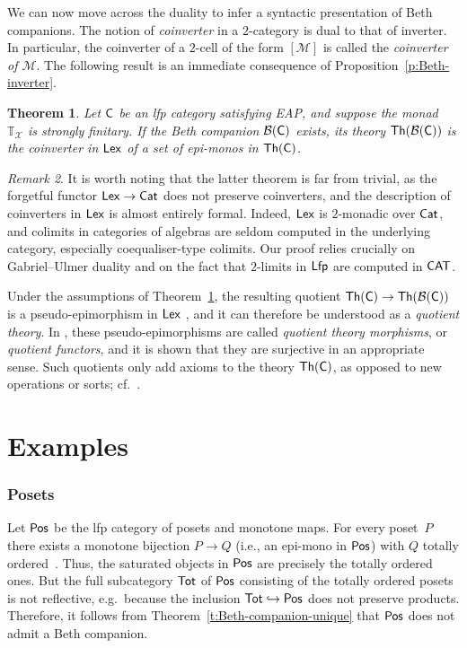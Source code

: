 \documentclass[a4paper,10pt,reqno]{amsart}
\newtheorem{theorem}{Theorem}[section]
\theoremstyle{definition}
\theoremstyle{remark}
\newtheorem{remark}[theorem]{Remark}
\newcommand{\cat}{{\sf C}}								%
\newcommand{\Pos}{{\sf Pos}}								%
\newcommand{\Tot}{{\sf Tot}}								%
\newcommand{\B}[1]{\mathcal{B}(#1)}						%
\newcommand{\Lfp}{{\sf Lfp}}								%
\newcommand{\Lex}{{\sf Lex}}								%
\newcommand{\Cat}{{\sf Cat}}								%
\newcommand{\CAT}{{\sf CAT}}								%
\newcommand{\ar}[1]{\mathcal{#1}}							%
\newcommand{\X}{\ar{X}}									%
\newcommand{\into}{\hookrightarrow}						%
\newcommand{\EAP}{\textnormal{EAP}}
\begin{document}
We can now move across the duality to infer a syntactic presentation of Beth companions. The notion of \emph{coinverter} in a $2$-category is dual to that of inverter. In particular, the coinverter of a $2$-cell of the form $[\ar{M}]$ is called the \emph{coinverter of $\ar{M}$}. The following result is an immediate consequence of Proposition~\ref{p:Beth-inverter}.


\begin{theorem}\label{t:syntactic-Beth-companion}
  Let $\cat$ be an lfp category satisfying \EAP, and suppose the monad~$\mathbb{T}_{\X}$ is strongly finitary. If the Beth companion $\B{\cat}$ exists, its theory $\mathsf{Th}(\B{\cat})$ is the coinverter in $\Lex$ of a set of epi-monos in $\mathsf{Th}(\cat)$.
\end{theorem}

\begin{remark}
  It is worth noting that the latter theorem is far from trivial, as the forgetful functor $\Lex \to \Cat$ does not preserve coinverters, and the description of coinverters in $\Lex$ is almost entirely formal. Indeed, $\Lex$ is $2$-monadic over $\Cat$, and colimits in categories of algebras are seldom computed in the underlying category, especially coequaliser-type colimits. Our proof relies crucially on Gabriel--Ulmer duality and on the fact that $2$-limits in $\Lfp$ are computed in $\CAT$.
\end{remark}

Under the assumptions of Theorem~\ref{t:syntactic-Beth-companion}, the resulting quotient $\mathsf{Th}(\cat) \to \mathsf{Th}(\B{\cat})$ is a pseudo-epimorphism in $\Lex$ \cite[Lemma~2.29]{Bourke2010Codescent}, and it can therefore be understood as a \emph{quotient theory}. In \cite[\S III.1]{HebertAdamekRosicky2001}, these pseudo-epimorphisms are called \emph{quotient theory morphisms}, or \emph{quotient functors}, and it is shown that they are surjective in an appropriate sense. Such quotients only add axioms to the theory $\mathsf{Th}(\cat)$, as opposed to new operations or sorts; cf.\ \cite[p.~486]{MakkaiPitts1987}.


\section{Examples}\label{s:examples}

\subsubsection*{Posets} Let $\Pos$ be the lfp category of posets and monotone maps. For every poset~$P$ there exists a monotone bijection $P\to Q$ (i.e., an epi-mono in $\Pos$) with $Q$ totally ordered~\cite{Szpilrajn1930}. Thus, the saturated objects in $\Pos$ are precisely the totally ordered ones. But the full subcategory $\Tot$ of $\Pos$ consisting of the totally ordered posets is not reflective, e.g.\ because the inclusion $\Tot\into \Pos$ does not preserve products. Therefore, it follows from Theorem~\ref{t:Beth-companion-unique} that $\Pos$ does not admit a Beth companion.
\end{document}
